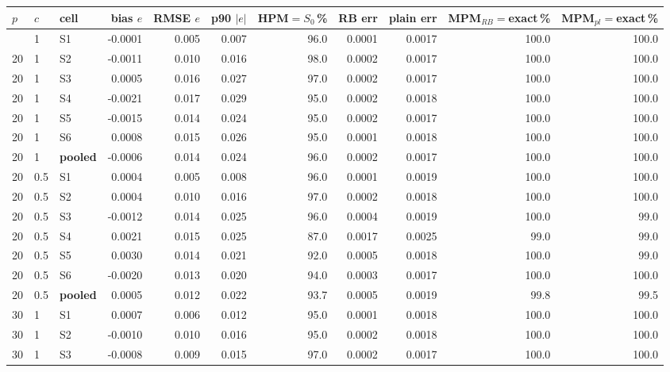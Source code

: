 {\scriptsize
\setlength{\tabcolsep}{4pt}
\begin{longtable}{lllrrrrrrrr}
\toprule
$p$ & $c$ & cell & bias $e$ & RMSE $e$ & p90 $|e|$ & HPM$=S_0$\,\% & RB err & plain err & MPM$_{RB}{=}$exact\,\% & MPM$_{pl}{=}$exact\,\% \\
\midrule
\endhead
\bottomrule
\endfoot
20 & 1 & S1 & -0.0001 & 0.005 & 0.007 & 96.0 & 0.0001 & 0.0017 & 100.0 & 100.0 \\
20 & 1 & S2 & -0.0011 & 0.010 & 0.016 & 98.0 & 0.0002 & 0.0017 & 100.0 & 100.0 \\
20 & 1 & S3 & 0.0005 & 0.016 & 0.027 & 97.0 & 0.0002 & 0.0017 & 100.0 & 100.0 \\
20 & 1 & S4 & -0.0021 & 0.017 & 0.029 & 95.0 & 0.0002 & 0.0018 & 100.0 & 100.0 \\
20 & 1 & S5 & -0.0015 & 0.014 & 0.024 & 95.0 & 0.0002 & 0.0017 & 100.0 & 100.0 \\
20 & 1 & S6 & 0.0008 & 0.015 & 0.026 & 95.0 & 0.0001 & 0.0018 & 100.0 & 100.0 \\
20 & 1 & \textbf{pooled} & -0.0006 & 0.014 & 0.024 & 96.0 & 0.0002 & 0.0017 & 100.0 & 100.0 \\
\midrule
20 & 0.5 & S1 & 0.0004 & 0.005 & 0.008 & 96.0 & 0.0001 & 0.0019 & 100.0 & 100.0 \\
20 & 0.5 & S2 & 0.0004 & 0.010 & 0.016 & 97.0 & 0.0002 & 0.0018 & 100.0 & 100.0 \\
20 & 0.5 & S3 & -0.0012 & 0.014 & 0.025 & 96.0 & 0.0004 & 0.0019 & 100.0 & 99.0 \\
20 & 0.5 & S4 & 0.0021 & 0.015 & 0.025 & 87.0 & 0.0017 & 0.0025 & 99.0 & 99.0 \\
20 & 0.5 & S5 & 0.0030 & 0.014 & 0.021 & 92.0 & 0.0005 & 0.0018 & 100.0 & 99.0 \\
20 & 0.5 & S6 & -0.0020 & 0.013 & 0.020 & 94.0 & 0.0003 & 0.0017 & 100.0 & 100.0 \\
20 & 0.5 & \textbf{pooled} & 0.0005 & 0.012 & 0.022 & 93.7 & 0.0005 & 0.0019 & 99.8 & 99.5 \\
\midrule
30 & 1 & S1 & 0.0007 & 0.006 & 0.012 & 95.0 & 0.0001 & 0.0018 & 100.0 & 100.0 \\
30 & 1 & S2 & -0.0010 & 0.010 & 0.016 & 95.0 & 0.0002 & 0.0018 & 100.0 & 100.0 \\
30 & 1 & S3 & -0.0008 & 0.009 & 0.015 & 97.0 & 0.0002 & 0.0017 & 100.0 & 100.0 \\

\end{longtable}}
